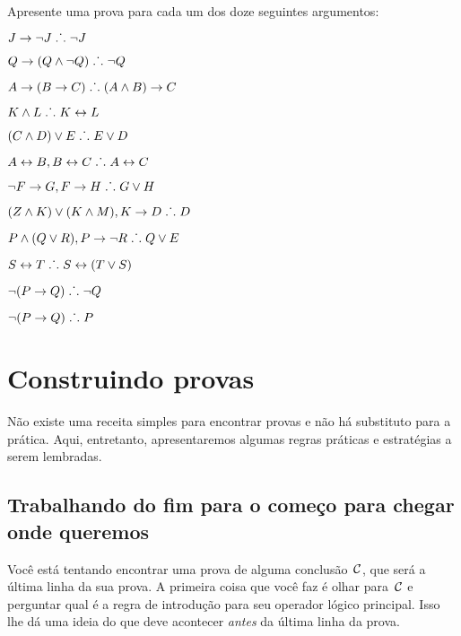 \solutions
\problempart
\label{pr.solvedTFLproofs}
Apresente uma prova para cada um dos doze seguintes argumentos:
\begin{earg}
\item $J\rightarrow\neg J \mathrel{\ldotp\dot{}\,\ldotp} \neg J$
\item $Q\rightarrow(Q\wedge\neg Q) \mathrel{\ldotp\dot{}\,\ldotp} \neg Q$
\item $A\rightarrow (B\rightarrow C) \mathrel{\ldotp\dot{}\,\ldotp} (A\wedge B)\rightarrow C$
\item $K\wedge L \mathrel{\ldotp\dot{}\,\ldotp} K\leftrightarrow L$
\item $(C\wedge D)\vee E \mathrel{\ldotp\dot{}\,\ldotp} E\vee D$
\item $A\leftrightarrow B, B\leftrightarrow C \mathrel{\ldotp\dot{}\,\ldotp} A\leftrightarrow C$
\item $\neg F\rightarrow G, F\rightarrow H \mathrel{\ldotp\dot{}\,\ldotp} G\vee H$
\item $(Z\wedge K) \vee (K\wedge M), K \rightarrow D \mathrel{\ldotp\dot{}\,\ldotp} D$
\item $P \wedge (Q\vee R), P\rightarrow \neg R \mathrel{\ldotp\dot{}\,\ldotp} Q\vee E$
\item $S\leftrightarrow T \mathrel{\ldotp\dot{}\,\ldotp} S\leftrightarrow (T\vee S)$
\item $\neg (P \rightarrow Q) \mathrel{\ldotp\dot{}\,\ldotp} \neg Q$
\item $\neg (P \rightarrow Q) \mathrel{\ldotp\dot{}\,\ldotp} P$
\end{earg}


\chapter{Construindo provas}\label{s:stratTFL}

 N\~ao existe uma receita simples para encontrar provas e n\~ao h\'a substituto para a pr\'atica. Aqui, entretanto, apresentaremos algumas regras pr\'aticas e estrat\'egias a serem lembradas.

\section{Trabalhando do fim para o come\c co para chegar onde queremos}

 Voc\^e est\'a tentando encontrar uma prova de alguma conclus\~ao~$\mathcal{C}$, que ser\'a a \'ultima linha da sua prova. A primeira coisa que voc\^e faz \'e olhar para~$\mathcal{C}$ e perguntar qual \'e a regra de introdu\c c\~ao para seu operador l\'ogico principal. Isso lhe d\'a uma ideia do que deve acontecer \emph{antes} da \'ultima linha da prova. 

